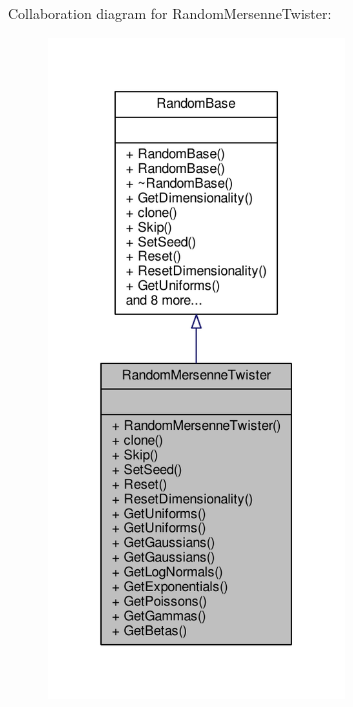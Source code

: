 Collaboration diagram for Random\+Mersenne\+Twister\+:
\nopagebreak
\begin{figure}[H]
\begin{center}
\leavevmode
\includegraphics[width=223pt]{classRandomMersenneTwister__coll__graph}
\end{center}
\end{figure}

